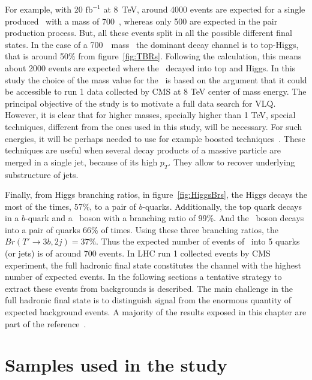 For example, with 20 $\text{fb}^{-1}$ at 8~TeV, around 4000 events are expected for a single produced \Tp~with a mass of 700~\GeVcc, whereas only 500 are expected in the pair production process. But, all these events split in all the possible different final states. In the case of a 700~\GeVcc~mass \Tp~the dominant decay channel is to top-Higgs, that is around 50\% from figure~\ref{fig:TBRs}. Following the calculation, this means about 2000 events are expected where the \Tp~decayed into top and Higgs. In this study the choice of the mass value for the \Tp~is based on the argument that it could be accessible to run 1 data collected by CMS at 8 TeV center of mass energy. The principal objective of the study is to motivate a full data search for VLQ. However, it is clear that for higher masses, specially higher than 1 TeV, special techniques, different from the ones used in this study, will be necessary. For such energies, it will be perhaps needed to use for example boosted techniques~\cite{CMS:2013vca, ATLAS-CONF-2013-084, Usai:2015vva}. These techniques are useful when several decay products of a massive particle are merged in a single jet, because of its high $p_{T}$. They allow to recover underlying substructure of jets.

Finally, from Higgs branching ratios, in figure~\ref{fig:HiggsBrs}, the Higgs decays the most of the times, 57\%, to a pair of $b$-quarks. Additionally, the top quark decays in a $b$-quark and a \W~boson with a branching ratio of 99\%. And the \W~boson decays into a pair of quarks 66\% of times. Using these three branching ratios, the $Br(T'\to 3b, 2j)=37$\%. Thus the expected number of events of \Tp~into 5 quarks (or jets) is of around 700 events. In LHC run 1 collected events by CMS experiment, the full hadronic final state constitutes the channel with the highest number of expected events. In the following sections a tentative strategy to extract these events from backgrounds is described. The main challenge in the full hadronic final state is to distinguish signal from the enormous quantity of expected background events. A majority of the results exposed in this chapter are part of the reference~\cite{Beauceron:2014ila}.


\section{Samples used in the study}
\label{sec:PhenoSam}

